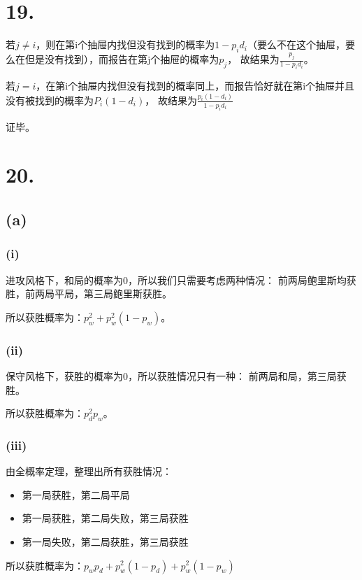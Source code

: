 \documentclass[UTF8]{article}
\begin{document}
    \section*{19.}
        若$j \ne i$，则在第i个抽屉内找但没有找到的概率为$1 - p_id_i$（要么不在这个抽屉，要么在但是没有找到），而报告在第j个抽屉的概率为$p_j$，
        故结果为$\frac{p_j}{1 - p_id_i}$。

        若$j = i$，在第i个抽屉内找但没有找到的概率同上，而报告恰好就在第i个抽屉并且没有被找到的概率为$P_i(1 - d_i)$，
        故结果为$\frac{p_i(1 - d_i)}{1 - p_id_i}$

        证毕。
    \section*{20.}
        \subsection*{(a)}
            \subsubsection*{(i)}
                进攻风格下，和局的概率为0，所以我们只需要考虑两种情况：
                前两局鲍里斯均获胜，前两局平局，第三局鲍里斯获胜。

                所以获胜概率为：$p_w^2 + p_w^2(1 - p_w)$。
            \subsubsection*{(ii)}
                保守风格下，获胜的概率为0，所以获胜情况只有一种：
                前两局和局，第三局获胜。

                所以获胜概率为：$p_d^2p_w$。
            \subsubsection*{(iii)}
                由全概率定理，整理出所有获胜情况：

                \begin{itemize}
                    \item 第一局获胜，第二局平局
                    \item 第一局获胜，第二局失败，第三局获胜
                    \item 第一局失败，第二局获胜，第三局获胜
                \end{itemize}

                所以获胜概率为：$p_wp_d + p_w^2(1 - p_d) + p_w^2(1 - p_w)$
\end{document}
